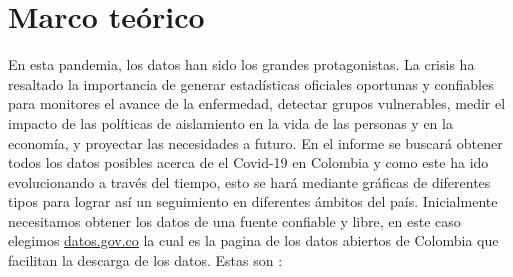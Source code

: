 \documentclass[conference,compsoc,onecolumn]{IEEEtran}
\begin{document}
\section{Marco teórico}
\label{sec:introduction}
En esta pandemia, los datos han sido los grandes protagonistas. La crisis ha resaltado la importancia de generar estadísticas oficiales oportunas y confiables para monitores el avance de la enfermedad, detectar grupos vulnerables, medir el impacto de las políticas de aislamiento en la vida de las personas y en la economía, y proyectar las necesidades a futuro.
\singlespacing
En el informe se buscará obtener todos los datos posibles acerca de el Covid-19 en Colombia y como este ha ido evolucionando a través del tiempo, esto se hará mediante gráficas de diferentes tipos para lograr así un seguimiento en diferentes ámbitos del país.
\singlespacing
Inicialmente necesitamos obtener los datos de una fuente confiable y libre, en este caso elegimos \href{https://www.datos.gov.co/}{datos.gov.co} la cual es la pagina de los datos abiertos de Colombia que facilitan la descarga de los datos.
\singlespacing
Estas son :
\end{document}
